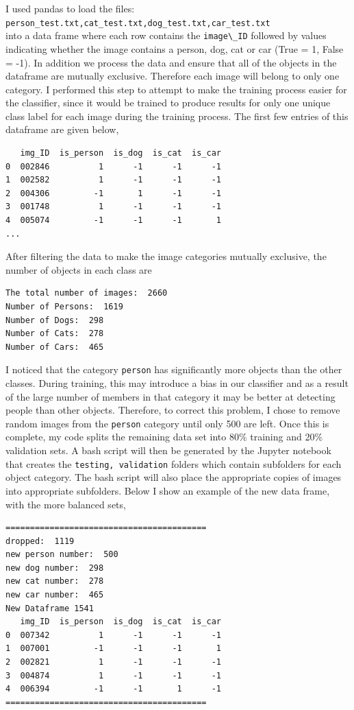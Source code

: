 \documentclass[10pt,a4paper]{article}
\begin{document}
I used pandas to load the files:\\ 
\lstinline{person_test.txt,cat_test.txt,dog_test.txt,car_test.txt}\\
into a data frame where each row contains the \lstinline{image\_ID} followed by values indicating whether the image contains a person, dog, cat or car (True = 1, False = -1). In addition we process the data and ensure that all of the objects in the dataframe are mutually exclusive. Therefore each image will belong to only one category. I performed this step to attempt to make the training process easier for the classifier, since it would be trained to produce results for only one unique class label  for each image during the training process. The first few entries of this dataframe are given below,
\begin{lstlisting}
   img_ID  is_person  is_dog  is_cat  is_car
0  002846          1      -1      -1      -1
1  002582          1      -1      -1      -1
2  004306         -1       1      -1      -1
3  001748          1      -1      -1      -1
4  005074         -1      -1      -1       1
...
\end{lstlisting}
After filtering the data to make the image categories mutually exclusive, the number of objects in each class are
\begin{lstlisting}
The total number of images:  2660
Number of Persons:  1619
Number of Dogs:  298
Number of Cats:  278
Number of Cars:  465
\end{lstlisting}
I noticed that the category \lstinline{person} has significantly more objects than the other classes. During training, this may introduce a bias in our classifier and as a result of the large number of members in that category it may be better at detecting people than other objects. Therefore, to correct this problem, I chose to remove random images from the \lstinline{person} category until only 500 are left. Once this is complete, my code splits the remaining data set into 80$\%$ training and 20$\%$ validation sets. A bash script will then be generated by the Jupyter notebook that creates the \lstinline{testing, validation} folders which contain subfolders for each object category. The bash script will also place the appropriate copies of images into appropriate subfolders. Below I show an example of the new data frame, with the more balanced sets,
\begin{lstlisting}
=========================================
dropped:  1119
new person number:  500
new dog number:  298
new cat number:  278
new car number:  465
New Dataframe 1541
   img_ID  is_person  is_dog  is_cat  is_car
0  007342          1      -1      -1      -1
1  007001         -1      -1      -1       1
2  002821          1      -1      -1      -1
3  004874          1      -1      -1      -1
4  006394         -1      -1       1      -1
=========================================
\end{lstlisting}
\end{document}
